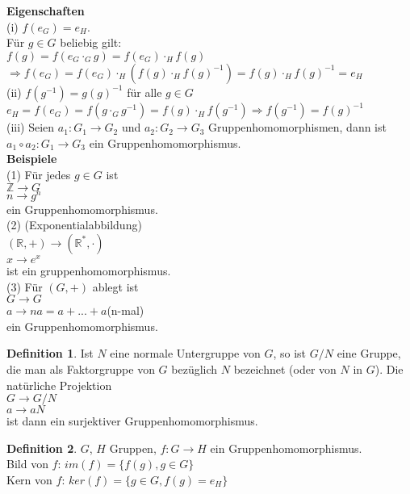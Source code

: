 \documentclass[12pt]{scrartcl}%
\theoremstyle{definition}
\newtheorem*{defn}{Definition}
\theoremstyle{remark}
\begin{document}
\textbf{Eigenschaften}\\
(i) $f(e_G)=e_H.$\\
Für $g\in G$ beliebig gilt:\\
$f(g)=f(e_{G}\cdot_{G}g)=f(e_G)\cdot_{H}f(g)$\\
$\Rightarrow f(e_G)=f(e_G)\cdot_{H}(f(g)\cdot_{H}f(g)^{-1})=f(g)\cdot_{H}f(g)^{-1}=e_H$\\
(ii) $f(g^{-1})=g(g)^{-1}$ für alle $g\in G$\\
$e_H=f(e_G)=f(g\cdot_G g^{-1})=f(g)\cdot_{H}f(g^{-1}) \Rightarrow f(g^{-1})=f(g)^{-1}$\\
(iii) Seien $a_1: G_1\rightarrow G_2$ und $a_2: G_2\rightarrow G_3$ Gruppenhomomorphismen, 
dann ist $a_1\circ a_2: G_1\rightarrow G_3$ ein Gruppenhomomorphismus.\\

\textbf{Beispiele}\\
(1) Für jedes $g \in G$ ist\\
$\mathbb{Z} \rightarrow G$\\
$n \rightarrow g^n$\\
ein Gruppenhomomorphismus.\\
(2) (Exponentialabbildung) \\
$(\mathbb{R},+)\rightarrow(\mathbb{R}^*,\cdot)$\\
$x\rightarrow e^x$\\
ist ein gruppenhomomorphismus.\\
(3) Für $(G,+)$ ablegt ist\\
$G\rightarrow G$\\
$a\rightarrow na = a+...+a$(n-mal)\\
ein Gruppenhomomorphismus.

\begin{defn}
Ist $N$ eine normale Untergruppe von $G$, so ist $G/N$ eine Gruppe, die man als Faktorgruppe von $G$ bezüglich $N$ bezeichnet (oder von $N$ in $G$).
Die natürliche Projektion\\
$G\rightarrow G/N$\\
$a\rightarrow aN$\\
ist dann ein surjektiver Gruppenhomomorphismus.
\end{defn}

\begin{defn}
$G$, $H$ Gruppen, $f: G\rightarrow H$ ein Gruppenhomomorphismus.\\
Bild von $f$: $im(f)=\{f(g),g\in G\}$\\
Kern von $f$: $ker(f)=\{g\in G,f(g)=e_H\}$
\end{defn}
\end{document}
